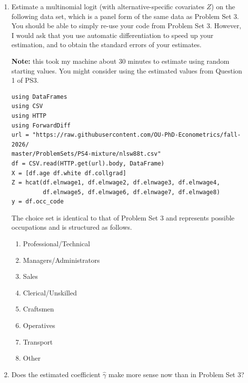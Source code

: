 \documentclass[12pt,english]{article}
\begin{document}
\begin{enumerate}
\item Estimate a multinomial logit (with alternative-specific covariates $Z$) on the following data set, which is a panel form of the same data as Problem Set 3. You should be able to simply re-use your code from Problem Set 3. However, I would ask that you use automatic differentiation to speed up your estimation, and to obtain the standard errors of your estimates.

\textbf{Note:} this took my machine about 30 minutes to estimate using random starting values. You might consider using the estimated values from Question 1 of PS3.

\begin{verbatim}
using DataFrames
using CSV
using HTTP
using ForwardDiff
url = "https://raw.githubusercontent.com/OU-PhD-Econometrics/fall-2026/
master/ProblemSets/PS4-mixture/nlsw88t.csv"
df = CSV.read(HTTP.get(url).body, DataFrame)
X = [df.age df.white df.collgrad]
Z = hcat(df.elnwage1, df.elnwage2, df.elnwage3, df.elnwage4, 
         df.elnwage5, df.elnwage6, df.elnwage7, df.elnwage8)
y = df.occ_code
\end{verbatim}

The choice set is identical to that of Problem Set 3 and represents possible occupations and is structured  as follows.

\begin{enumerate}
    \item[1] Professional/Technical 
    \item[2] Managers/Administrators
    \item[3] Sales                  
    \item[4] Clerical/Unskilled     
    \item[5] Craftsmen              
    \item[6] Operatives             
    \item[7] Transport              
    \item[8] Other                  
\end{enumerate}

\item Does the estimated coefficient $\hat{\gamma}$ make more sense now than in Problem Set 3?


\end{enumerate}
\end{document}
